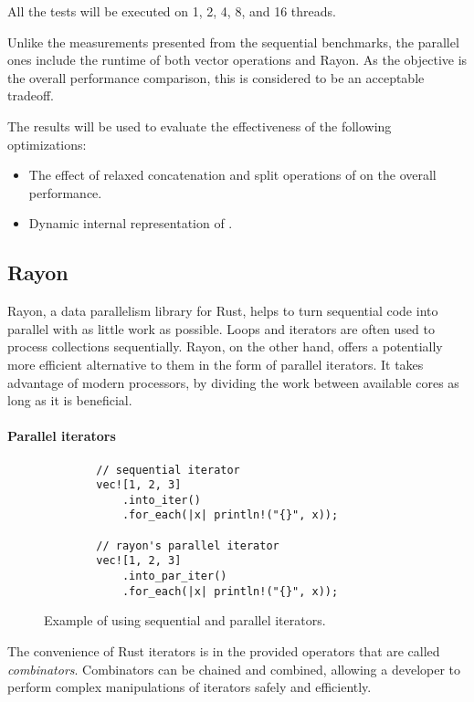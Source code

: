 All the tests will be executed on 1, 2, 4, 8, and 16 threads.

Unlike the measurements presented from the sequential benchmarks, the parallel ones include the runtime of both vector operations and Rayon. As the objective is the overall performance comparison, this is considered to be an acceptable tradeoff.

The results will be used to evaluate the effectiveness of the following optimizations:
\begin{itemize}
    \item The effect of relaxed concatenation and split operations of \rrbvec{} on the overall performance.
    \item Dynamic internal representation of \pvec{}.
\end{itemize}

\subsection{Rayon}
Rayon, a data parallelism library for Rust, helps to turn sequential code into parallel with as little work as possible. Loops and iterators are often used to process collections sequentially. Rayon, on the other hand, offers a potentially more efficient alternative to them in the form of parallel iterators. It takes advantage of modern processors, by dividing the work between available cores as long as it is beneficial.

\paragraph{Parallel iterators}
\begin{figure}[!htbp]
    \centering

    \begin{verbatim}
        // sequential iterator
        vec![1, 2, 3]
            .into_iter()
            .for_each(|x| println!("{}", x));

        // rayon's parallel iterator
        vec![1, 2, 3]
            .into_par_iter()
            .for_each(|x| println!("{}", x));
    \end{verbatim}

    \caption{Example of using sequential and parallel iterators.}
    \label{fig:par-iter-example}
\end{figure}

The convenience of Rust iterators is in the provided operators that are called \emph{combinators}. Combinators can be chained and combined, allowing a developer to perform complex manipulations of iterators safely and efficiently.

